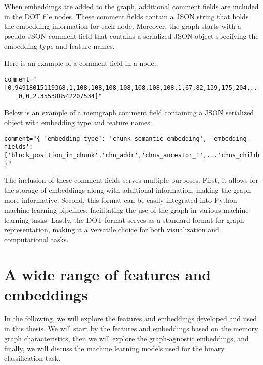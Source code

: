 When embeddings are added to the graph, additional comment fields are included in the DOT file nodes. These comment fields contain a JSON string that holds the embedding information for each node. Moreover, the graph starts with a pseudo JSON comment field that contains a serialized JSON object specifying the embedding type and feature names. 

Here is an example of a comment field in a node:

\begin{lstlisting}[style=text, caption={A comment field example for a node with embedding. Output is cropped.}]
    comment="[0,94918015119368,1,108,108,108,108,108,108,108,1,67,82,139,175,204,...
    0,0,2.355388542207534]"
\end{lstlisting}

Below is an example of a \gls{memgraph} comment field containing a JSON serialized object with embedding type and feature names.

\begin{lstlisting}[style=text, caption={A memgraph comment field example containing JSON serialized object with embedding type and feature names. Output is cropped.}]
    comment="{ 'embedding-type': 'chunk-semantic-embedding', 'embedding-fields': ['block_position_in_chunk','chn_addr','chns_ancestor_1',...'chns_children_8','chunk_byte_size','chunk_number_in_heap','chunk_ptrs','chunk_vns','ptrs_ancestor_1','ptrs_ancestor_2',...,'ptrs_children_8','entropy'] }"
\end{lstlisting}

The inclusion of these comment fields serves multiple purposes. First, it allows for the storage of embeddings along with additional information, making the graph more informative. Second, this format can be easily integrated into Python machine learning pipelines, facilitating the use of the graph in various machine learning tasks. Lastly, the DOT format serves as a standard format for graph representation, making it a versatile choice for both visualization and computational tasks.

\section{A wide range of features and embeddings}
In the following, we will explore the features and embeddings developed and used in this thesis. We will start by the features and embeddings based on the memory graph characteristics, then we will explore the graph-agnostic embeddings, and finally, we will discuss the machine learning models used for the binary classification task.

